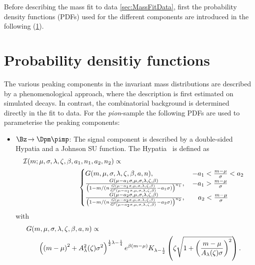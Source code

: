 Before describing the mass fit to data {\cref{sec:MassFitData}}, first the probability density functions (PDFs) used for the different components are introduced in the following (\cref{sec:PDFs}).

\section{Probability densitiy functions}
\label{sec:PDFs}

The various peaking components in the invariant mass distributions are described by a phenomenological approach, where the description is first
estimated on simulated decays.
In contrast, the combinatorial background is determined directly in the fit to data.
For the \emph{pion}-sample the following PDFs are used to parameterise the peaking components:
\begin{itemize}
	\item $\Bz\!\to\Dpm\pimp$: The signal component is described by a double-sided Hypatia and a Johnson SU function.
	The Hypatia~\cite{Santos:2013ky} is defined as
	\begin{equation}
	\begin{aligned}
	&\mathcal{I}(m;\mu,\sigma,\lambda,\zeta,\beta,a_1,n_1,a_2,n_2) \propto\\
	&\hspace{2.8cm}\begin{cases}
	G(m,\mu,\sigma,\lambda,\zeta,\beta,a,n), &\,   - a_1 < \frac{m - \mu}{\sigma} < a_2 \\
	\frac{G(\mu - a_1 \sigma,\mu,\sigma,\lambda,\zeta,\beta)}{\left(1 - m/(n \frac{G(\mu - a_1\sigma,\mu,\sigma,\lambda,\zeta,\beta)}{G^\prime(\mu - a_1 \sigma,\mu,\sigma,\lambda,\zeta,\beta)} -a_1 \sigma)\right)^{n_1}},	&\,  - a_1 > \frac{m - \mu}{\sigma} \\
	\frac{G(\mu - a_2 \sigma,\mu,\sigma,\lambda,\zeta,\beta)}{\left(1 - m/(n \frac{G(\mu - a_2\sigma,\mu,\sigma,\lambda,\zeta,\beta)}{G^\prime(\mu - a_2 \sigma,\mu,\sigma,\lambda,\zeta,\beta)} -a_2 \sigma)\right)^{n_2}},	&\quad a_2 < \frac{m - \mu}{\sigma} \\
	\end{cases}
	\label{eq:ipatia}
	\end{aligned}
	\end{equation}
	with
	\begin{equation}
	\begin{aligned}
	&G(m,\mu,\sigma,\lambda,\zeta,\beta,a,n)\propto\\
	&\hspace{0.6cm}\left(\left(m-\mu\right)^2+A_\lambda^2(\zeta)\sigma^2\right)^{\frac{1}{2}\lambda-\frac{1}{4}}e^{\beta\left(m-\mu\right)}K_{\lambda-\frac{1}{2}}\left(\zeta\sqrt{1+\left(\frac{m-\mu}{A_\lambda(\zeta)\sigma}\right)^2}\right).

\end{aligned}
\end{equation}
\end{itemize}
